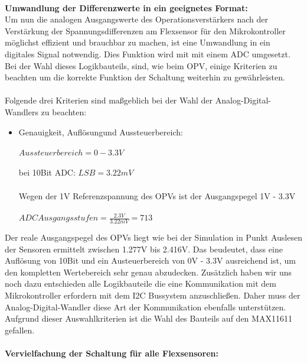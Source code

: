 \documentclass[11pt]{article}
\begin{document}
\\
\textbf{Umwandlung der Differenzwerte in ein geeignetes Format:}
\\
Um nun die analogen Ausgangswerte des Operationsverstärkers nach der Verstärkung der Spannungsdifferenzen am Flexsensor für
den Mikrokontroller möglichst effizient und brauchbar zu machen, ist eine Umwandlung in ein digitales Signal notwendig.
Dies Funktion wird mit mit einem ADC umgesetzt. Bei der Wahl dieses Logikbauteils, sind, wie beim OPV, einige Kriterien zu 
beachten um die korrekte Funktion der Schaltung weiterhin zu gewährleisten. \\
\\
Folgende drei Kriterien sind maßgeblich bei der Wahl der Analog-Digital-Wandlers zu beachten:
\begin{itemize}
	\item Genauigkeit, Auflösungund Aussteuerbereich: \\
		  \\
		  \hspace*{1cm} $ Aussteuerbereich = 0 - 3.3V $ \\
		  \\
		  \hspace*{1cm} bei 10Bit ADC: $ LSB = 3.22mV $ \\
		  \\
		  \hspace*{1cm} Wegen der 1V Referenzspannung des OPVs ist der Ausgangspegel 1V - 3.3V \\
		  \\
		  \hspace*{1cm} $ ADC Ausgangsstufen = \frac{2.3V}{3.22mV} = 713 $ \\
\end{itemize}
Der reale Ausgangspegel des OPVs liegt wie bei der Simulation in Punkt Auslesen der Sensoren ermittelt zwischen 1.277V bis 2.416V.
Das beudeutet, dass eine Auflösung von 10Bit und ein Austeuerbereich von 0V - 3.3V ausreichend ist, um den kompletten Wertebereich
sehr genau abzudecken. Zusätzlich haben wir uns noch dazu entschieden alle Logikbauteile die eine Kommunikation mit dem Mikrokontroller
erfordern mit dem I2C Bussystem anzuschließen. Daher muss der Analog-Digital-Wandler diese Art der Kommunikation ebenfalls unterstützen.
Aufgrund dieser Auswahlkriterien ist die Wahl des Bauteils auf den MAX11611 gefallen.\\
\\
\textbf{Vervielfachung der Schaltung für alle Flexsensoren:}
\\
\end{document}
